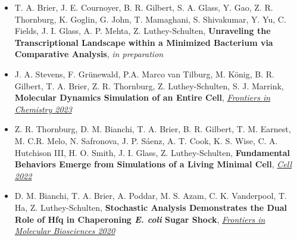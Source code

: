 \documentclass[letterpaper,10pt]{article}
\begin{document}
\begin{itemize}[leftmargin=0.35in, label={}, labelindent=5pt,itemindent=-15pt]
  \setlength\itemsep{-0.4em}
\item \textcolor{color1}{T. A. Brier}, J. E. Cournoyer, B. R. Gilbert, S. A. Glass, Y. Gao, Z. R. Thornburg, K. Goglin, G. John, T. Mamaghani, S. Shivakumar,   Y. Yu, C. Fields, J. I. Glass, A. P. Mehta, Z. Luthey-Schulten, \textbf{Unraveling the Transcriptional Landscape within a Minimized Bacterium via Comparative Analysis}, \textit{in preparation}



\item J. A. Stevens, F. Gr\"{u}newald, P.A. Marco van Tilburg, M. K\"{o}nig, B. R. Gilbert, \textcolor{color1}{T. A. Brier}, Z. R. Thornburg, Z. Luthey-Schulten, S. J. Marrink, \textbf{Molecular Dynamics Simulation of an Entire Cell}, \href{https://doi.org/10.3389/fchem.2023.1106495}{\textit{Frontiers in Chemistry 2023}}%

\item Z. R. Thornburg, D. M. Bianchi, \textcolor{color1}{T. A. Brier}, B. R. Gilbert, T. M. Earnest, M. C.R. Melo, N. Safronova, J. P. S\'{a}enz, A. T. Cook, K. S. Wise, C. A. Hutchison III, H. O. Smith, J. I. Glass, Z. Luthey-Schulten, \textbf{Fundamental Behaviors Emerge from Simulations of a Living Minimal Cell}, \href{https://doi.org/10.1016/j.cell.2021.12.025}{\textit{Cell 2022}}%

\item D. M. Bianchi, \textcolor{color1}{T. A. Brier}, A. Poddar, M. S. Azam, C. K. Vanderpool, T. Ha, Z. Luthey-Schulten, \textbf{Stochastic Analysis Demonstrates the Dual Role of Hfq in Chaperoning \textit{E. coli} Sugar Shock}, \href{https://doi.org/10.3389/fmolb.2020.593826}{\textit{Frontiers in Molecular Biosciences 2020}}%


\end{itemize}
\end{document}
